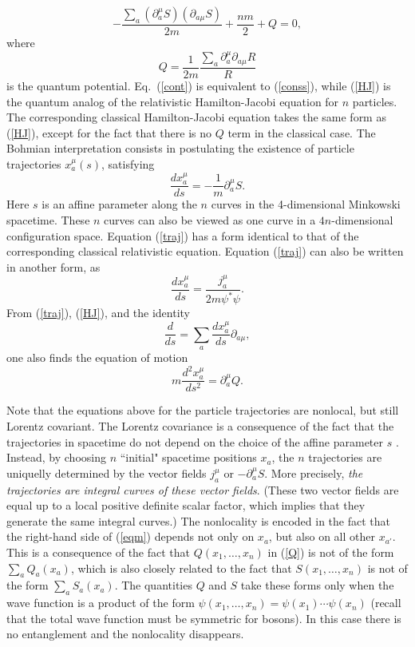 \documentclass[12pt]{article}
\begin{document}
\begin{equation}\label{HJ}
-\frac{\sum_a(\partial_a^{\mu}S)(\partial_{a\mu}S)}{2m} +\frac{nm}{2} +Q=0,
\end{equation}
where
\begin{equation}\label{Q}
Q=\frac{1}{2m}\frac{\sum_a\partial_a^{\mu}\partial_{a\mu}R}{R}
\end{equation}
is the quantum potential. Eq.~(\ref{cont}) is equivalent to 
(\ref{conss}), while (\ref{HJ}) is the quantum analog of the 
relativistic Hamilton-Jacobi equation for $n$ particles. 
The corresponding classical Hamilton-Jacobi equation takes the same
form as (\ref{HJ}), except for the fact that there is no $Q$ term
in the classical case.  
The Bohmian interpretation consists in postulating the existence 
of particle trajectories $x_a^{\mu}(s)$, satisfying
\begin{equation}\label{traj}
\frac{dx_a^{\mu}}{ds} = -\frac{1}{m}\partial_a^{\mu}S .
\end{equation} 
Here $s$ is an affine parameter along the $n$ curves
in the 4-dimensional Minkowski spacetime. These $n$ curves can also 
be viewed as one curve in a $4n$-dimensional configuration 
space. Equation (\ref{traj}) has a form identical 
to that of the corresponding
classical relativistic equation. Equation (\ref{traj}) 
can also be written in another form, as
\begin{equation}\label{traj2}
\frac{dx_a^{\mu}}{ds} = \frac{j_a^{\mu}}{2m\psi^*\psi} .
\end{equation}
From (\ref{traj}), (\ref{HJ}), and the identity 
\begin{equation}
\frac{d}{ds}=\sum_a\frac{dx_a^{\mu}}{ds}\partial_{a\mu},
\end{equation}
one also finds the equation of motion
\begin{equation}\label{eqm}
m\frac{d^2x_a^{\mu}}{ds^2}=\partial_a^{\mu}Q.
\end{equation}

Note that the equations above for the particle trajectories are nonlocal, 
but still Lorentz covariant.
The Lorentz covariance is a consequence of the fact that the trajectories 
in spacetime do not depend on the choice of the affine parameter 
$s$ \cite{bern}. Instead, by choosing $n$ ``initial" spacetime positions
$x_a$, the $n$ trajectories are uniquelly determined by the vector fields 
$j_a^{\mu}$ or $-\partial_a^{\mu}S$. More precisely, 
{\em the trajectories are integral curves of these vector fields}. 
(These two vector fields are equal up to a local positive definite scalar
factor, which implies that they generate the same integral curves.)  
The nonlocality is encoded in the fact that the right-hand 
side of (\ref{eqm}) depends not only on $x_a$, but also 
on all other $x_{a'}$. This is a consequence of the fact that 
$Q(x_1,\ldots ,x_n)$ in (\ref{Q}) is not of the form 
$\sum_a Q_a(x_a)$, which is also closely related to the fact that
$S(x_1,\ldots ,x_n)$ is not of the form 
$\sum_a S_a(x_a)$. The quantities $Q$ and $S$ take these forms 
only when the wave function is a product of the form
$\psi(x_1,\ldots ,x_n)=\psi(x_1)\cdots\psi(x_n)$ (recall that the 
total wave function must be symmetric for bosons). In this case 
there is no entanglement and the nonlocality disappears. 
\end{document}
